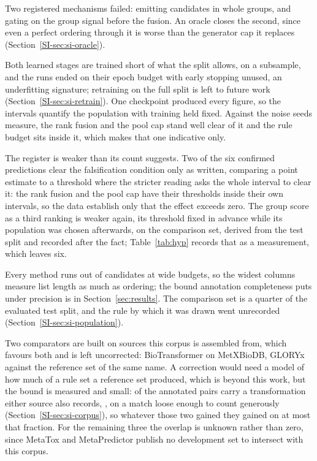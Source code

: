 Two registered mechanisms failed: emitting candidates in whole groups, and gating on the group
signal before the fusion. An oracle closes the second, since even a perfect ordering through it
is worse than the generator cap it replaces (Section~\ref{SI-sec:si-oracle}).

Both learned stages are trained short of what the split allows, on a subsample, and the runs ended on their epoch budget with early stopping unused, an underfitting signature; retraining on the full split is
left to future work (Section~\ref{SI-sec:si-retrain}). One checkpoint produced every figure, so the
intervals quantify the population with training held fixed. Against the noise
\numSpreadSeedsWord{} seeds measure, the rank fusion and the pool cap stand well clear of it
and the rule budget sits inside it, which makes that one indicative only.

The register is weaker than its count suggests. Two of the six confirmed predictions clear the
falsification condition only as written, comparing a point estimate to a threshold where the
stricter reading asks the whole interval to clear it: the rank fusion and the pool cap have their
thresholds inside their own intervals, so the data establish only that the effect exceeds zero.
The group score as a third ranking is weaker again, its threshold fixed in advance while its
population was chosen afterwards, on the comparison set, derived from the test split and recorded
after the fact; Table~\ref{tab:hyp} records that as a measurement, which leaves six.

Every method runs out of candidates at wide budgets, so the widest columns measure list length as
much as ordering; the bound annotation completeness puts under precision is in
Section~\ref{sec:results}. The comparison set is a quarter of the evaluated test split, and the rule
by which it was drawn went unrecorded (Section~\ref{SI-sec:si-population}).

Two comparators are built on sources this corpus is assembled from, which favours both and is left
uncorrected: BioTransformer on MetXBioDB, GLORYx against the reference set of the same name.
A correction would need a model of how much of a rule set a reference set produced, which is
beyond this work, but the bound is measured and small: \numSrccovTraced{} of the \numSrccovPairs{}
annotated pairs carry a transformation either source also records, \numSrccovSharePct{}, on a
match loose enough to count generously (Section~\ref{SI-sec:si-corpus}), so whatever those two
gained they gained on at most that fraction. For the remaining three the overlap is unknown rather than zero, since MetaTox and
MetaPredictor publish no development set to intersect with this corpus.

